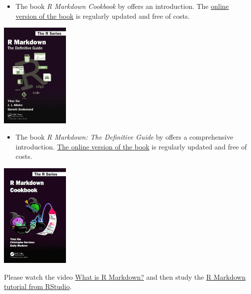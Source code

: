 \documentclass[
  12pt,
  oneside]{book}
\providecommand{\tightlist}{%
  \setlength{\itemsep}{0pt}\setlength{\parskip}{0pt}}
\theoremstyle{definition}
\theoremstyle{definition}
\theoremstyle{definition}
\theoremstyle{definition}
\theoremstyle{remark}
\begin{document}
\begin{itemize}
\tightlist
\item
  The book \emph{R Markdown Cookbook} by \citet{Xie2020R} offers an introduction. The \href{https://bookdown.org/yihui/rmarkdown-cookbook}{online version of the book} is regularly updated and free of costs.
\end{itemize}

\includegraphics[width=0.25\textwidth,height=\textheight]{fig/rmarkdownbook.png}

\begin{itemize}
\tightlist
\item
  The book \emph{R Markdown: The Definitive Guide} by \citet{Xie2018R} offers a comprehensive introduction. \href{https://bookdown.org/yihui/rmarkdown}{The online version of the book} is regularly updated and free of costs.
\end{itemize}

\includegraphics[width=0.25\textwidth,height=\textheight]{fig/rmcb.png}

Please watch the video \href{https://vimeo.com/178485416}{What is R Markdown?} and then study the \href{https://rmarkdown.rstudio.com/lesson-1.html}{R Markdown tutorial from RStudio}.
\end{document}
